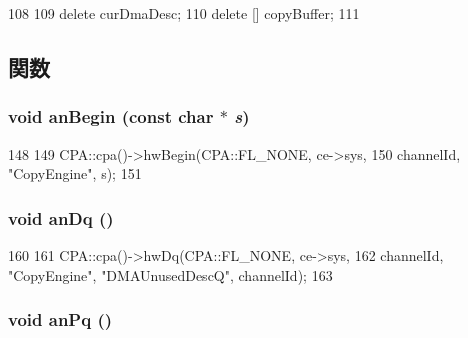 \begin{DoxyCode}
108 {
109     delete curDmaDesc;
110     delete [] copyBuffer;
111 }
\end{DoxyCode}


\subsection{関数}
\hypertarget{classCopyEngine_1_1CopyEngineChannel_a8000b4835a66b0ff75fa7f5512f727a2}{
\subsubsection[{anBegin}]{\setlength{\rightskip}{0pt plus 5cm}void anBegin (const char $\ast$ {\em s})}}
\label{classCopyEngine_1_1CopyEngineChannel_a8000b4835a66b0ff75fa7f5512f727a2}



\begin{DoxyCode}
148         {
149             CPA::cpa()->hwBegin(CPA::FL_NONE, ce->sys,
150                          channelId, "CopyEngine", s);
151         }
\end{DoxyCode}
\hypertarget{classCopyEngine_1_1CopyEngineChannel_a6d48da71893149c635dac1dfb9db7cc9}{
\subsubsection[{anDq}]{\setlength{\rightskip}{0pt plus 5cm}void anDq ()}}
\label{classCopyEngine_1_1CopyEngineChannel_a6d48da71893149c635dac1dfb9db7cc9}



\begin{DoxyCode}
160         {
161             CPA::cpa()->hwDq(CPA::FL_NONE, ce->sys,
162                       channelId, "CopyEngine", "DMAUnusedDescQ", channelId);
163         }
\end{DoxyCode}
\hypertarget{classCopyEngine_1_1CopyEngineChannel_a404a8353a35bc56b38afd5a5f6733bee}{
\subsubsection[{anPq}]{\setlength{\rightskip}{0pt plus 5cm}void anPq ()}}
\label{classCopyEngine_1_1CopyEngineChannel_a404a8353a35bc56b38afd5a5f6733bee}



